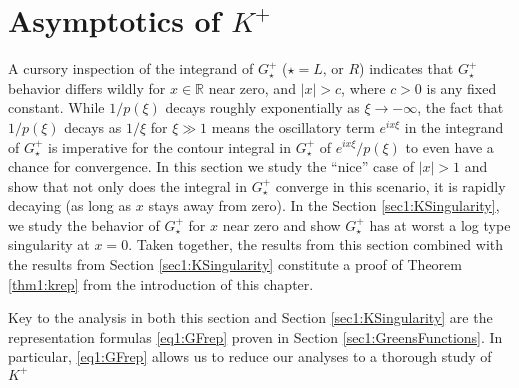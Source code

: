 \documentclass[../dissertation.tex]{subfiles}
\begin{document}
\section{Asymptotics of $K^+$}\label{sec1:AsympK}
A cursory inspection of the integrand of $G_\star^+$ ($\star = L \text{, or }R$) 
indicates that $G_\star^+$ behavior
differs wildly for $x \in \mathbb R$ near zero, and $|x| > c$, where $c>0$ is any
fixed constant. While $1/p(\xi)$ decays roughly exponentially as $\xi \to -\infty$, 
the fact that $1/p(\xi)$ decays as $1/\xi$ for $\xi \gg 1$ means the oscillatory term 
$e^{ix\xi}$ in the integrand of $G_\star^+$ is imperative for the contour 
integral in $G_\star^+$ of $e^{ix\xi} / p(\xi)$ to even have a chance for convergence.
In this section we study the ``nice'' case of $|x|>1$ and show that not only does 
the integral in $G_\star^+$ converge in this scenario, it is rapidly decaying (as long 
as $x$ stays away from zero). In the Section \ref{sec1:KSingularity}, we study
the behavior of $G_\star^+$ for $x$ near zero and show $G_\star^+$ has at worst a log 
type singularity at $x=0$. Taken together, the results from this section 
combined with the results from Section \ref{sec1:KSingularity} constitute a 
proof of Theorem \ref{thm1:krep} from the introduction of this chapter. 

Key to the analysis in both this section and Section \ref{sec1:KSingularity}
are the representation formulas \eqref{eq1:GFrep} proven in Section 
\ref{sec1:GreensFunctions}. In particular, \eqref{eq1:GFrep} allows us
to reduce our analyses to a thorough study of $K^+$
\end{document}
